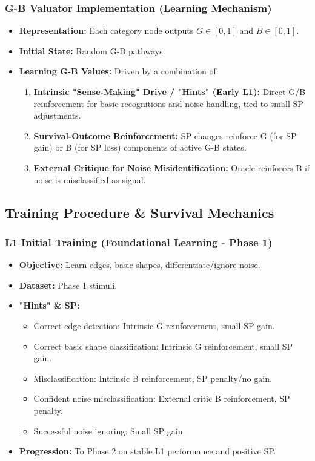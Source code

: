 \documentclass{article}
\begin{document}
\subsubsection{G-B Valuator Implementation (Learning Mechanism)}
\begin{itemize}
    \item \textbf{Representation:} Each category node outputs $G \in [0,1]$ and $B \in [0,1]$.
    \item \textbf{Initial State:} Random G-B pathways.
    \item \textbf{Learning G-B Values:} Driven by a combination of:
    \begin{enumerate}
        \item \textbf{Intrinsic "Sense-Making" Drive / "Hints" (Early L1):} Direct G/B reinforcement for basic recognitions and noise handling, tied to small SP adjustments.
        \item \textbf{Survival-Outcome Reinforcement:} SP changes reinforce G (for SP gain) or B (for SP loss) components of active G-B states.
        \item \textbf{External Critique for Noise Misidentification:} Oracle reinforces B if noise is misclassified as signal.
    \end{enumerate}
\end{itemize}

\subsection{Training Procedure \& Survival Mechanics}

\subsubsection{L1 Initial Training (Foundational Learning - Phase 1)}
\begin{itemize}
    \item \textbf{Objective:} Learn edges, basic shapes, differentiate/ignore noise.
    \item \textbf{Dataset:} Phase 1 stimuli.
    \item \textbf{"Hints" \& SP:}
    \begin{itemize}
        \item Correct edge detection: Intrinsic G reinforcement, small SP gain.
        \item Correct basic shape classification: Intrinsic G reinforcement, small SP gain.
        \item Misclassification: Intrinsic B reinforcement, SP penalty/no gain.
        \item Confident noise misclassification: External critic B reinforcement, SP penalty.
        \item Successful noise ignoring: Small SP gain.
    \end{itemize}
    \item \textbf{Progression:} To Phase 2 on stable L1 performance and positive SP.
\end{itemize}
\end{document}
